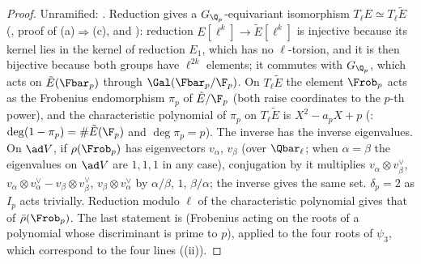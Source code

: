 \begin{proof}
Unramified: . Reduction gives a $G_{\Q_p}$-equivariant isomorphism $T_\ell E\simeq T_\ell\tilde E$ (, proof of
(a)$\Rightarrow$(c), and ): reduction $E[\ell^k]\to\tilde E[\ell^k]$ is injective because its kernel lies in the kernel of reduction $E_1$, which has no
$\ell$-torsion, and it is then bijective because both groups have $\ell^{2k}$ elements; it commutes with $G_{\Q_p}$, which acts on $\tilde E(\Fbar_p)$ through
$\Gal(\Fbar_p/\F_p)$. On $T_\ell\tilde E$ the element $\Frob_p$ acts as the Frobenius endomorphism $\pi_p$ of $\tilde E/\F_p$ (both raise coordinates to the $p$-th power), and the
characteristic polynomial of $\pi_p$ on $T_\ell\tilde E$ is $X^2-a_pX+p$ (: $\deg(1-\pi_p)=\#\tilde E(\F_p)$ and $\deg\pi_p=p$). The inverse has
the inverse eigenvalues. On $\ad V$, if $\rho(\Frob_p)$ has eigenvectors $v_\alpha$, $v_\beta$ (over $\Qbar_\ell$; when $\alpha=\beta$ the eigenvalues on
$\ad V$ are $1,1,1$ in any case), conjugation by it multiplies $v_\alpha\otimes v_\beta^\vee$, $v_\alpha\otimes v_\alpha^\vee-v_\beta\otimes v_\beta^\vee$, $v_\beta\otimes v_\alpha^\vee$
by $\alpha/\beta$, $1$, $\beta/\alpha$; the inverse gives the same set. $\delta_p=2$ as $I_p$ acts trivially. Reduction modulo $\ell$ of the characteristic
polynomial gives that of $\bar\rho(\Frob_p)$. The last statement is  (Frobenius acting on the roots of a polynomial whose
discriminant is prime to $p$), applied to the four roots of $\psi_3$, which correspond to the four lines ((ii)).
\end{proof}

